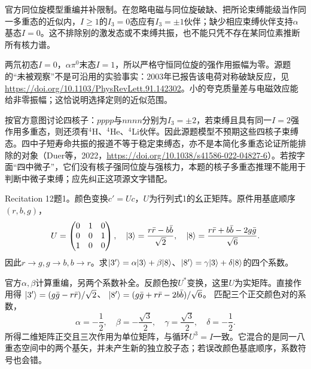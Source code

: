 \begin{solution}
官方同位旋模型重编并补限制。在忽略电磁与同位旋破缺、把所论束缚能级当作同一多重态的近似内，$I\ge1$的$I_3=0$态应有$I_3=\pm1$伙伴；缺少相应束缚伙伴支持$\alpha$基态$I=0$。这不排除别的激发态或不束缚共振，也不能只凭不存在某同位素推断所有核力谱。

两氘初态$I=0$，$\alpha\pi^0$末态$I=1$，所以严格守恒同位旋的强作用振幅为零。源题的“未被观察”不是可沿用的实验事实：2003年已报告该电荷对称破缺反应，见\url{https://doi.org/10.1103/PhysRevLett.91.142302}。小的夸克质量差与电磁效应能给非零振幅；这恰说明选择定则的近似范围。

按官方意图讨论四核子：$pppp$与$nnnn$分别为$I_3=\pm2$，若束缚且具有同一$I=2$强作用多重态，则还须有$^4$H、$^4$He、$^4$Li伙伴。因此源题模型不预期这些四核子束缚态。四中子短寿命共振的报道不等于稳定束缚态，亦不是本简化多重态论证所能排除的对象（Duer等，2022，\url{https://doi.org/10.1038/s41586-022-04827-6}）。若按字面“四中微子”，它们没有核子强同位旋与强核力，本题的核子多重态推理不能用于判断中微子束缚；应先纠正这项源文字错配。
\end{solution}
\begin{exercise}\label{ex:rec-12-1}
Recitation 12题1。颜色变换$c'=Uc$，$U$为行列式1的幺正矩阵。原件用基底顺序$(r,b,g)$，
\begin{equation}
 U=\begin{pmatrix}0&1&0\\0&0&1\\1&0&0\end{pmatrix},\quad
 \lvert 3\rangle=\frac{r\bar r-b\bar b}{\sqrt2},\quad
 \lvert 8\rangle=\frac{r\bar r+b\bar b-2g\bar g}{\sqrt6}.
\end{equation}
因此$r\to g,g\to b,b\to r$。求$\lvert 3'\rangle=\alpha\lvert 3\rangle+\beta\lvert 8\rangle$、$\lvert 8'\rangle=\gamma\lvert 3\rangle+\delta\lvert 8\rangle$的四个系数。
\end{exercise}
\begin{solution}
官方$\alpha,\beta$计算重编，另两个系数补全。反颜色按$U^*$变换，这里$U$为实矩阵。直接作用得
$\lvert 3'\rangle=(g\bar g-r\bar r)/\sqrt2$、
$\lvert 8'\rangle=(g\bar g+r\bar r-2b\bar b)/\sqrt6$。
匹配三个正交颜色对的系数，
\begin{equation}
 \alpha=-\frac12,\quad\beta=-\frac{\sqrt3}2,\quad
 \gamma=\frac{\sqrt3}2,\quad\delta=-\frac12.
\end{equation}
所得二维矩阵正交且三次作用为单位矩阵，与循环$U^3=I$一致。它混合的是同一八重态空间中的两个基矢，并未产生新的独立胶子态；若误改颜色基底顺序，系数符号也会错。
\end{solution}
